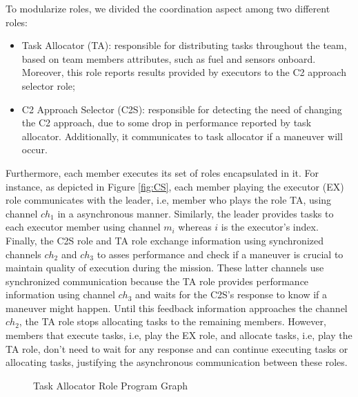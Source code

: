To modularize roles, we divided the coordination aspect among two different roles:

\begin{itemize}
    \item Task Allocator (TA): responsible for distributing tasks throughout the team, based on team members attributes, such as fuel and sensors onboard. Moreover, this role reports results provided by executors to the C2 approach selector role;
    \item C2 Approach Selector (C2S): responsible for detecting the need of changing the C2 approach, due to some drop in performance reported by task allocator. Additionally, it communicates to task allocator if a maneuver will occur.  
\end{itemize}

Furthermore, each member executes its set of roles encapsulated in it. For instance, as depicted in Figure \ref{fig:CS}, each member playing the executor (EX) role communicates with the leader, i.e, member who plays the role TA, using channel \textit{$ch_1$} in a asynchronous manner. Similarly, the leader provides tasks to each executor member using channel \textit{$m_i$} whereas $i$ is the executor's index. Finally, the C2S role and TA role exchange information using synchronized channels \textit{$ch_2$} and \textit{$ch_3$} to asses performance and check if a maneuver is crucial to maintain quality of execution during the mission. These latter channels use synchronized communication because the TA role provides performance information using channel \textit{$ch_3$} and waits for the C2S's response to know if a maneuver might happen. Until this feedback information approaches the channel \textit{$ch_2$}, the TA role stops allocating tasks to the remaining members. However, members that execute tasks, i.e, play the EX role, and allocate tasks, i.e, play the TA role, don't need to wait for any response and can continue executing tasks or allocating tasks, justifying the asynchronous communication between these roles.

\begin{figure}[!ht]
    \centering
    \scalebox{.65}{}
    \caption{Task Allocator Role Program Graph}
    \label{fig:TA}
\end{figure}

